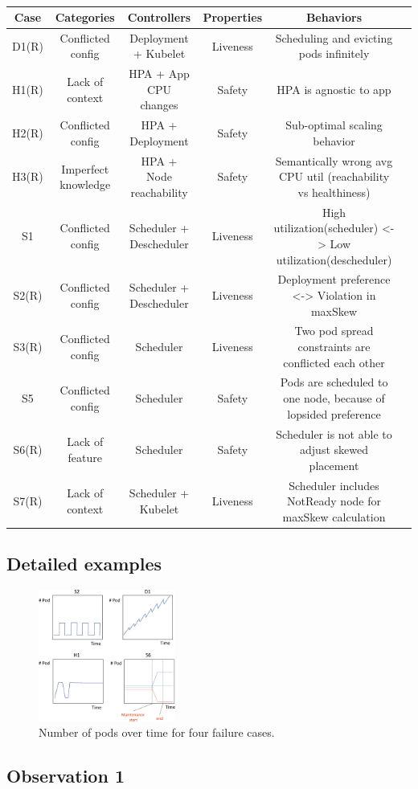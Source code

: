 \begin{table}[t]
    \centering
    \begin{tabular}{c c c c c c}
    \hline
        Case & Categories & Controllers & Properties & Behaviors  \\ 
        \hline
        D1(R) & Conflicted config & Deployment + Kubelet & Liveness & Scheduling and evicting pods infinitely  \\ 
        H1(R) & Lack of context & HPA + App CPU changes & Safety & HPA is agnostic to app  \\ 
        H2(R) & Conflicted config & HPA + Deployment & Safety & Sub-optimal scaling behavior  \\ 
        H3(R) & Imperfect knowledge & HPA + Node reachability & Safety & Semantically wrong avg CPU util (reachability vs healthiness)  \\ 
        S1 & Conflicted config & Scheduler + Descheduler & Liveness & High utilization(scheduler) <-> Low utilization(descheduler) \\ 
        S2(R) & Conflicted config & Scheduler + Descheduler & Liveness & Deployment preference <-> Violation in maxSkew \\ 
        S3(R) & Conflicted config & Scheduler & Liveness & Two pod spread constraints are conflicted each other  \\ 
        S5 & Conflicted config & Scheduler & Safety & Pods are scheduled to one node, because of lopsided preference  \\ 
        S6(R) & Lack of feature & Scheduler & Safety & Scheduler is not able to adjust skewed placement  \\ 
        S7(R) & Lack of context & Scheduler + Kubelet & Liveness & Scheduler includes NotReady node for maxSkew calculation  \\ 
        \hline
    \end{tabular}
    \caption{}
    \label{table:summary}
\end{table}

\subsection*{Detailed examples}

\begin{figure}[h]
    \centering
    \includegraphics[width=0.4\textwidth]{figure/num_pod.pdf}
    \caption{Number of pods over time for four failure cases.}
    \label{fig:num_pod}
\end{figure}


\subsection*{Observation 1}
